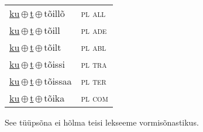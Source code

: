 \begin{minipage}{\textwidth}
\begin{sideways}
\begin{tabular}{l l}
\underline{ku}\,$\oplus$\,\underline{t}\,$\oplus$\,tõillõ & \textsc{ pl all } \\
\underline{ku}\,$\oplus$\,\underline{t}\,$\oplus$\,tõill & \textsc{ pl ade } \\
\underline{ku}\,$\oplus$\,\underline{t}\,$\oplus$\,tõilt & \textsc{ pl abl } \\
\underline{ku}\,$\oplus$\,\underline{t}\,$\oplus$\,tõissi & \textsc{ pl tra } \\
\underline{ku}\,$\oplus$\,\underline{t}\,$\oplus$\,tõissaa & \textsc{ pl ter } \\
\underline{ku}\,$\oplus$\,\underline{t}\,$\oplus$\,tõika & \textsc{ pl com } \\
\end{tabular}
\end{sideways}
\label{tab:tüüpsõnamall-kuto}

\end{minipage}

 
\vspace{1em}
\noindent See tüüpsõna ei hõlma teisi lekseeme vormi\-sõnastikus.

